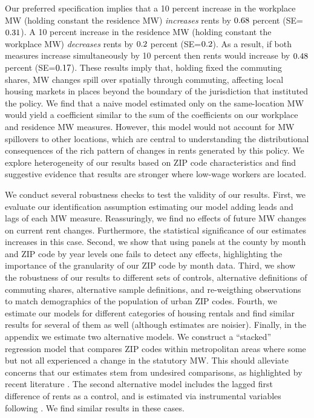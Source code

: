 
Our preferred specification implies that 
a 10 percent increase in the workplace MW (holding constant the residence MW) 
\textit{increases} rents by $\textnormal{0.68}$ percent 
(SE=$\textnormal{0.31}$).
A 10 percent increase in the residence MW (holding constant the workplace MW) 
\textit{decreases} rents by $\textnormal{0.2}$ percent 
(SE=$\textnormal{0.2}$). 
As a result, if both measures increase simultaneously by 10 percent then 
rents would increase by $\textnormal{0.48}$ percent 
(SE=$\textnormal{0.17}$).
These results imply that, holding fixed the commuting shares, MW 
changes spill over spatially through commuting, affecting local housing markets 
in places beyond the boundary of the jurisdiction that instituted the policy.
We find that a naive model estimated only on the same-location MW would yield a 
coefficient similar to the sum of the coefficients on our workplace and 
residence MW measures.
However, this model would not account for MW spillovers to other locations, 
which are central to understanding the distributional consequences of the rich 
pattern of changes in rents generated by this policy.
We explore heterogeneity of our results based on ZIP code characteristics and
find suggestive evidence that results are stronger where low-wage workers are 
located.


We conduct several robustness checks to test the validity of our results.
First, we evaluate our identification assumption estimating our model adding 
leads and lags of each MW measure.
Reassuringly, we find no effects of future MW changes on current rent changes.
Furthermore, the statistical significance of our estimates increases in 
this case.
Second, we show that using panels at the county by month and ZIP code by year 
levels one fails to detect any effects, highlighting the importance of the 
granularity of our ZIP code by month data.
Third, we show the robustness of our results to different sets of controls,
alternative definitions of commuting shares, alternative sample definitions,
and re-weigthing observations to match demographics of the population of
urban ZIP codes.
Fourth, we estimate our models for different categories of housing rentals and
find similar results for several of them as well (although estimates are noisier).
Finally, in the appendix we estimate two alternative models.
We construct a ``stacked'' regression model that compares ZIP codes within 
metropolitan areas where some but not all experienced a change in the 
statutory MW.
This should alleviate concerns that our estimates stem from undesired 
comparisons, as highlighted by recent literature 
\parencite{deChaisemartinEtAl2022,RothEtAl2022}.
The second alternative model includes the lagged first difference of rents as 
a control, and is estimated via instrumental variables following 
\textcite{ArellanoBond1991}.
We find similar results in these cases.

